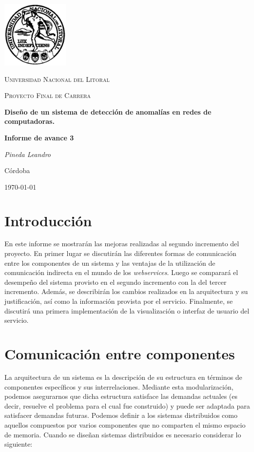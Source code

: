 \documentclass[a4paper,10pt, oneside]{article}
\begin{document}
	
\begin{titlepage}
	\centering
	\includegraphics[width=0.25\textwidth]{../../Universidad_del_Litoral}\par\vspace{1cm}
	{\scshape\LARGE Universidad Nacional del Litoral \par}
	\vspace{1cm}
	{\scshape\Large Proyecto Final de Carrera\par}
	\vspace{1.5cm}
	{\huge\bfseries Diseño de un sistema de detección de anomalías en redes de computadoras.\par}
	\vspace{4cm}
	{\huge\bfseries Informe de avance 3\par}
	\vfill
	
	{\Large \itshape Pineda Leandro\par}
	
	
	\large Córdoba\par
	{\large \today\par}	
\end{titlepage}

\modulolinenumbers[5]
\linenumbers

\section{Introducción}
En este informe se mostrarán las mejoras realizadas al segundo incremento del proyecto. En primer lugar se discutirán las diferentes formas de comunicación entre los componentes de un sistema y las ventajas de la utilización de comunicación indirecta en el mundo de los \textit{webservices}. Luego se comparará el desempeño del sistema provisto en el segundo incremento con la del tercer incremento. Además, se describirán los cambios realizados en la arquitectura y su justificación, así como la información provista por el servicio. Finalmente, se discutirá una primera implementación de la visualización o interfaz de usuario del servicio.
\newpage

\section{Comunicación entre componentes}
La arquitectura de un sistema es la descripción de su estructura en términos de componentes específicos y sus interrelaciones. Mediante esta modularización, podemos asegurarnos que dicha estructura satisface las demandas actuales (es decir, resuelve el problema para el cual fue construido) y puede ser adaptada para satisfacer demandas futuras.
Podemos definir a los sistemas distribuidos como aquellos compuestos por varios componentes que no comparten el mismo espacio de memoria\cite{Muhl:2006:DES:1162246}. Cuando se diseñan sistemas distribuidos es necesario considerar lo siguiente: 
\end{document}
